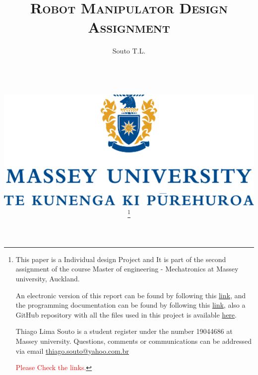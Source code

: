 \documentclass[transmag]{IEEEtran}
\begin{document}
\title{\textsc{Robot Manipulator Design Assignment}}

\clearpage\thispagestyle{empty}

\author{Souto T.L.

\\
\\
\\

\begin{centering}
\vspace{20mm}
\includegraphics[scale=0.25]{massey-png}
\end{centering}



\thanks{This paper is a Individual design Project and It is part of the second assignment of the course Master of engineering - Mechatronics at Massey university, Auckland.

An electronic version of this report can be found by following this \textcolor{blue}{\href{https://thiagosoutogit.github.io/Masters/Pages/Automation/Assessment02RoboticArm.html}{link}}, and the programming documentation can be found by following this \textcolor{blue}{\href{https://thiagosoutogit.github.io/Robot-Manipulator/}{link}}, also a GitHub repository with all the files used in this project is available \textcolor{blue}{\href{https://github.com/ThiagoSoutoGit/Robotic-Manipulator-Files}{here}}. 

Thiago Lima Souto is a student register under the number 19044686 at Massey university. Questions, comments or communications can be addressed via email \color{blue}\href{mailto:thiago.souto@yahoo.com.br}{thiago.souto@yahoo.com.br}

\textcolor{red}{Please Check the links.}
}}
\end{document}
